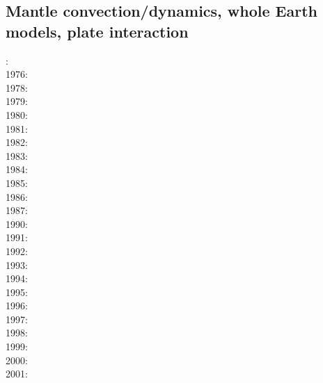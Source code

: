 \subsection*{Mantle convection/dynamics, whole Earth models, plate interaction}

: \cite{hemw75}\\
1976: \cite{mcri76}\\
1978: \cite{mahz78}\\
1979: \cite{ludt79}\cite{buss79}\\
1980: \cite{olco80}\cite{jamc80}\\
1981: \cite{buss81}\\
1982: \cite{jape82}\cite{homc82}\\
1983: \cite{hous83}\cite{hous83b}\cite{chri83}\cite{mcke83}\\
1984: \cite{olyb84}\cite{jarv84}\cite{haeb84}\cite{harp84}\cite{davi84}\cite{boas84}\cite{chri84}
      \cite{moca84}\cite{flyu84}\\
1985: \cite{jarv85}\cite{baum85}\cite{chri85}\cite{csra85}\\
1986: \cite{davi86}\cite{guda86}\\
1987: \cite{yuqh87}\\
1990: \cite{trab90}\\
1991: \cite{chha91}\cite{mawe91}\\
1992: \cite{besg92}\cite{mayw92}\cite{vayv92}\\
1993: \cite{zhch93}\cite{jarv93}\cite{tack93}\cite{bucc93}\cite{carm93}\cite{vavy93}\cite{tasg93}\\
1994: \cite{haeb94}\cite{chho94}\cite{tasg94}\cite{xita04b}\cite{xita04}\\
1995: \cite{zhgu95}\cite{vayv95}\cite{buba95}\\
1996: \cite{zhyu96}\cite{hond96}\cite{rytr96a}\cite{rytr96b}\cite{tack96}\cite{trbo96}
      \cite{birg96}\cite{burb96}\cite{kafo96}\cite{guez96}\cite{vayu96}\\
1997: \cite{hond97}\cite{iwho97}\cite{burb97}\cite{mole97}\\
1998: \cite{ande98}\cite{iwho98}\cite{devv98}\cite{tack98}\cite{tack98b}\cite{trha98b}
      \cite{trha98}\cite{burl98}\\
1999: \cite{duyr99}\\
2000: \cite{albe00}\cite{hayu00}\cite{devv00b}\cite{tack00b}\cite{zhzm00}\\
2001: \cite{vank01}\cite{riyb01}\cite{lemo01}\\
